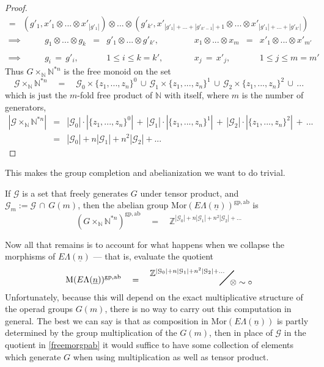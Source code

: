 \documentclass{amsbook} %
\newcommand{\bigquotient}[2]{ \raisebox{0.75\height}{$#1$} \mkern-12mu\scalebox{2}{$\diagup$}\mkern-10mu \raisebox{-0.5\height}{$#2$} }
\newcommand{\ELn}{E\Lambda(\underline{n})}
\numberwithin{section}{chapter}
\begin{document}
\begin{proof}
\[\begin{array}{rl}
			= & (g'_1, x'_1 \otimes ... \otimes x'_{|g'_1|}) \otimes ... \otimes (g'_{k'}, x'_{|g'_1| + ... + |g'_{k'-1}|+1} \otimes ... \otimes x'_{|g'_1| + ... + |g'_{k'}|})
		\end{array}
\]
\[ \begin{array}{rcclcccl}
			\implies \quad \quad & g_1 \otimes ... \otimes g_k & = & g'_1 \otimes ... \otimes g'_{k'}, & \quad \quad & x_1 \otimes ... \otimes x_{m} & = & x'_1 \otimes ... \otimes x'_{m'} \\
			& & & & & & & \\
			\implies \quad \quad & g_i \, = \, g'_i, & & 1 \le i \le k = k', & \quad \quad & x_j \, = \, x'_j, & & 1 \le j \le m = m' 
		\end{array}
\]
Thus $G \times_{\mathbb{N}} \mathbb{N}^{\ast n}$ is the free monoid on the set 
\[ \mathcal{G} \times_{\mathbb{N}} \mathbb{N}^{\ast n} \quad = \quad \mathcal{G}_0 \times \{ z_1, ..., z_n \}^0  \, \cup \, \mathcal{G}_1 \times \{ z_1, ..., z_n \}^1 \, \cup \, \mathcal{G}_2 \times \{ z_1, ..., z_n \}^2 \, \cup \, ...\]
which is just the $m$-fold free product of $\mathbb{N}$ with itself, where $m$ is the number of generators,
\[ \begin{array}{rll}
			|\mathcal{G} \times_{\mathbb{N}} \mathbb{N}^{\ast n}| & = & |\mathcal{G}_0| \cdot |\{ z_1, ..., z_n \}^0|  \, + \, |\mathcal{G}_1| \cdot |\{ z_1, ..., z_n \}^1| \, + \, |\mathcal{G}_2| \cdot |\{ z_1, ..., z_n \}^2| \, + \, ... \\
			& = & |\mathcal{G}_0| + n|\mathcal{G}_1| + n^2 |\mathcal{G}_2| + ... 
		\end{array}	
\]
\end{proof}

This makes the group completion and abelianization we want to do trivial. 

\begin{cor} \label{freemorgpab} If $\mathcal{G}$ is a set that freely generates $G$ under tensor product, and $\mathcal{G}_m := \mathcal{G} \, \cap \,  G(m)$, then the abelian group $\mathrm{Mor}(\ELn)^{\mathrm{gp}, \mathrm{ab}}$ is 
\[ (G \times_{\mathbb{N}} \mathbb{N}^{\ast n})^{\mathrm{gp}, \mathrm{ab}} \quad = \quad \mathbb{Z}^{|\mathcal{G}_0| + n|\mathcal{G}_1| + n^2 |\mathcal{G}_2| + ...} \]
\end{cor}

Now all that remains is to account for what happens when we collapse the morphisms of $\ELn$ --- that is, evaluate the quotient
\[ \mathrm{M}(\ELn)^{\mathrm{gp}, \mathrm{ab}} \quad = \quad \bigquotient{\mathbb{Z}^{|\mathcal{G}_0| + n|\mathcal{G}_1| + n^2 |\mathcal{G}_2| + ...}}{\otimes \sim \circ} \]
Unfortunately, because this will depend on the exact multiplicative structure of the operad groups $G(m)$, there is no way to carry out this computation in general. The best we can say is that as composition in $\mathrm{Mor}(\ELn)$ is partly determined by the group multiplication of the $G(m)$, then in place of $\mathcal{G}$ in the quotient in \cref{freemorgpab} it would suffice to have some collection of elements which generate $G$ when using multiplication as well as tensor product.
\end{document}
